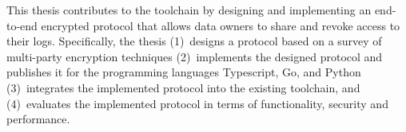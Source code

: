 \documentclass[../main.tex]{subfiles}
\begin{document}
This thesis contributes to the toolchain by designing and implementing an end-to-end encrypted protocol that allows data owners to share and revoke access to their logs.
Specifically, the thesis 
(1)~designs a protocol based on a survey of multi-party encryption techniques
(2)~implements the designed protocol and publishes it for the programming languages Typescript, Go, and Python
(3)~integrates the implemented protocol into the existing toolchain, and 
(4)~evaluates the implemented protocol in terms of functionality, security and performance.
\end{document}
